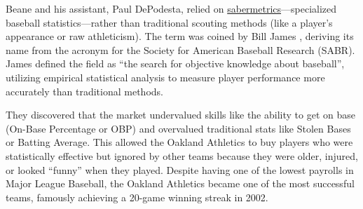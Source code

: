 Beane and his assistant, Paul DePodesta, relied on
\href{https://sabr.org/sabermetrics}{sabermetrics}—specialized baseball statistics—rather than 
traditional scouting methods (like a player's appearance or raw athleticism).
The term  was coined by Bill James \cite{james:1986}, deriving its name from the acronym for the
Society for American Baseball Research (SABR). James defined the field as ``the search for objective knowledge
about baseball'', utilizing empirical statistical analysis to measure player performance more accurately than
traditional methods. 

They discovered that the market undervalued skills like the ability to get on base (On-Base Percentage or OBP)
and overvalued traditional stats like Stolen Bases or Batting Average. 
This allowed the Oakland Athletics to buy players who were statistically effective but ignored by other teams because
they were older, injured, or looked ``funny'' when they played. Despite having one of the lowest payrolls in
Major League Baseball, the Oakland Athletics became one of the most successful teams, famously achieving a 20-game winning
streak in 2002. 

